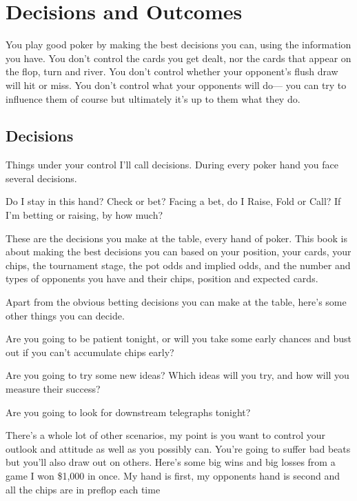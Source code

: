\chapter{Decisions and Outcomes}


You play good poker by making the best decisions you can,
using the information you have. You don't control the cards
you get dealt, nor the cards that appear on the flop, turn and river.
You don't control whether your opponent's flush draw will hit or miss.
You don't control what your opponents will do--- you can try to influence
them of course but ultimately it's up to them what they do.


\section{Decisions}

Things under your control I'll call decisions. During
every poker hand you face several decisions.

Do I stay in this hand? Check or bet? Facing a bet, do I
Raise, Fold or Call? If I'm betting or raising, by how much?

These are the decisions you make at the table, every hand
of poker. This book is about making the best
decisions you can based on your position, your cards, your chips,
the tournament stage, the pot odds and implied odds, and the number
and types of opponents you have and their chips, position and
expected cards.

Apart from the obvious betting decisions you can make at the table,
here's some other things you can decide.

Are you going to be patient tonight, or will you take some early
chances and bust out if you can't accumulate chips early?

Are you going to try some new ideas? Which ideas will
you try, and how will you measure their success?

Are you going to look for downstream telegraphs tonight?

There's a whole lot of other scenarios, my
point is you want to control your outlook and attitude as well as
you possibly can. You're going to suffer bad beats but you'll also
draw out on others. Here's some big wins and big losses from a game
I won \$1,000 in once. My hand is first, my opponents hand is second
and all the chips are in preflop each time

